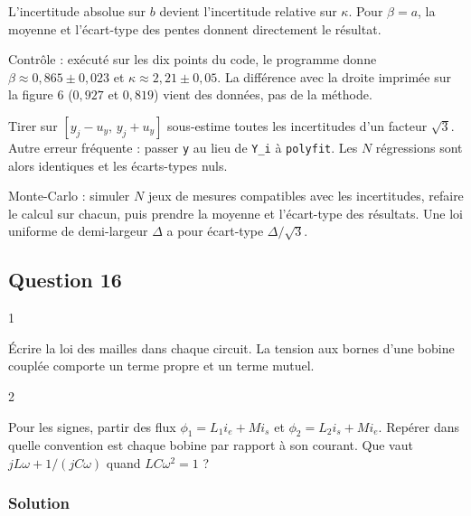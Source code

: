 \documentclass[11pt,a4paper]{article}
\begin{document}
L'incertitude absolue sur \(b\) devient l'incertitude relative sur \(\kappa\). Pour \(\beta=a\), la moyenne et l'écart-type des pentes donnent directement le résultat.

Contrôle : exécuté sur les dix points du code, le programme donne \(\beta\approx0{,}865\pm0{,}023\) et \(\kappa\approx2{,}21\pm0{,}05\). La différence avec la droite imprimée sur la figure 6 (\(0{,}927\) et \(0{,}819\)) vient des données, pas de la méthode.

\begin{piege}

Tirer sur \([y_j-u_y,\,y_j+u_y]\) sous-estime toutes les incertitudes d'un facteur \(\sqrt3\). Autre erreur fréquente : passer \texttt{y} au lieu de \texttt{Y\_i} à \texttt{polyfit}. Les \(N\) régressions sont alors identiques et les écarts-types nuls.

\end{piege}

\begin{methode}

Monte-Carlo : simuler \(N\) jeux de mesures compatibles avec les incertitudes, refaire le calcul sur chacun, puis prendre la moyenne et l'écart-type des résultats. Une loi uniforme de demi-largeur \(\Delta\) a pour écart-type \(\Delta/\sqrt3\).

\end{methode}

\hypertarget{question-16}{%
\subsection{Question 16}\label{question-16}}

\begin{indication}{1}

Écrire la loi des mailles dans chaque circuit. La tension aux bornes d'une bobine couplée comporte un terme propre et un terme mutuel.

\end{indication}

\begin{indication}{2}

Pour les signes, partir des flux \(\phi_1=L_1i_e+Mi_s\) et \(\phi_2=L_2i_s+Mi_e\). Repérer dans quelle convention est chaque bobine par rapport à son courant. Que vaut \(jL\omega+1/(jC\omega)\) quand \(LC\omega^2=1\) ?

\end{indication}

\hypertarget{solution-15}{%
\subsubsection{Solution}\label{solution-15}}
\end{document}
